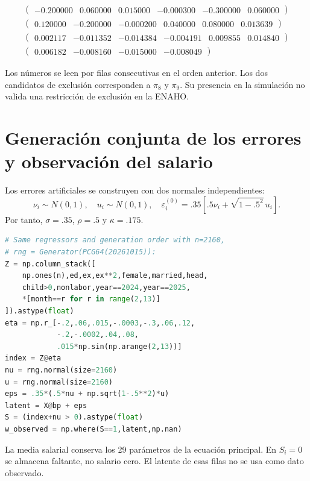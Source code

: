 \documentclass[11pt,a4paper]{article}
\begin{document}
\[
\begin{gathered}\begin{pmatrix}-0.200000 & 0.060000 & 0.015000 & -0.000300 & -0.300000 & 0.060000\end{pmatrix}\\\begin{pmatrix}0.120000 & -0.200000 & -0.000200 & 0.040000 & 0.080000 & 0.013639\end{pmatrix}\\\begin{pmatrix}0.002117 & -0.011352 & -0.014384 & -0.004191 & 0.009855 & 0.014840\end{pmatrix}\\\begin{pmatrix}0.006182 & -0.008160 & -0.015000 & -0.008049\end{pmatrix}\end{gathered}
\]

Los números se leen por filas consecutivas en el orden anterior. Los dos candidatos de exclusión corresponden a $\pi_8$ y $\pi_9$. Su presencia en la simulación no valida una restricción de exclusión en la ENAHO.

\clearpage
\section{Generación conjunta de los errores y observación del salario}

Los errores artificiales se construyen con dos normales independientes:
\[
\nu_i\sim N(0,1),\quad u_i\sim N(0,1),\quad
\varepsilon_i^{(0)}=.35[.5\nu_i+\sqrt{1-.5^2}\,u_i].
\]
Por tanto, $\sigma=.35$, $\rho=.5$ y $\kappa=.175$.
\begin{lstlisting}[language=Python]
# Same regressors and generation order with n=2160,
# rng = Generator(PCG64(20261015)):
Z = np.column_stack([
    np.ones(n),ed,ex,ex**2,female,married,head,
    child>0,nonlabor,year==2024,year==2025,
    *[month==r for r in range(2,13)]
]).astype(float)
eta = np.r_[-.2,.06,.015,-.0003,-.3,.06,.12,
            -.2,-.0002,.04,.08,
            .015*np.sin(np.arange(2,13))]
index = Z@eta
nu = rng.normal(size=2160)
u = rng.normal(size=2160)
eps = .35*(.5*nu + np.sqrt(1-.5**2)*u)
latent = X@bp + eps
S = (index+nu > 0).astype(float)
w_observed = np.where(S==1,latent,np.nan)
\end{lstlisting}
La media salarial conserva los 29 parámetros de la ecuación principal. En $S_i=0$ se almacena faltante, no salario cero. El latente de esas filas no se usa como dato observado.
\end{document}
